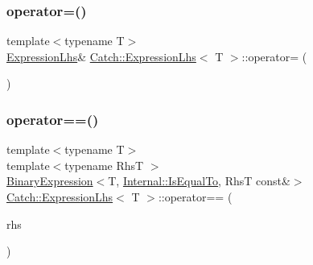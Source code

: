\subsubsection{\texorpdfstring{operator=()}{operator=()}}
{\footnotesize\ttfamily template$<$typename T$>$ \\
\hyperlink{class_catch_1_1_expression_lhs}{Expression\+Lhs}\& \hyperlink{class_catch_1_1_expression_lhs}{Catch\+::\+Expression\+Lhs}$<$ T $>$\+::operator= (\begin{DoxyParamCaption}\item[{const \hyperlink{class_catch_1_1_expression_lhs}{Expression\+Lhs}$<$ T $>$ \&}]{ }\end{DoxyParamCaption})}

\mbox{\label{class_catch_1_1_expression_lhs_abebe4afc079c91ae548ab8fdba6c77f2}} 
\subsubsection{\texorpdfstring{operator==()}{operator==()}\hspace{0.1cm}{\footnotesize\ttfamily [1/2]}}
{\footnotesize\ttfamily template$<$typename T$>$ \\
template$<$typename RhsT $>$ \\
\hyperlink{class_catch_1_1_binary_expression}{Binary\+Expression}$<$T, \hyperlink{namespace_catch_1_1_internal_ae3f96598a7858155750bf38e7295d83ea30e0accba6ec8384f4383b04dd2a6a9e}{Internal\+::\+Is\+Equal\+To}, RhsT const\&$>$ \hyperlink{class_catch_1_1_expression_lhs}{Catch\+::\+Expression\+Lhs}$<$ T $>$\+::operator== (\begin{DoxyParamCaption}\item[{RhsT const \&}]{rhs }\end{DoxyParamCaption})\hspace{0.3cm}{\ttfamily [inline]}}

\mbox{\label{class_catch_1_1_expression_lhs_ab803185079504a65b0af95f7c9669351}} 
